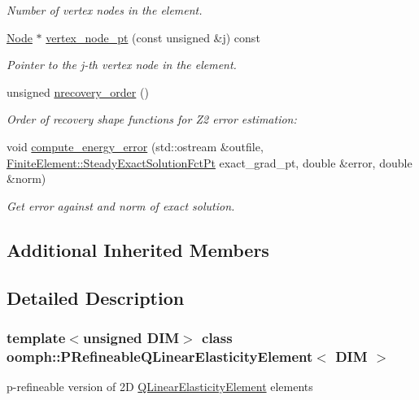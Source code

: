 \begin{DoxyCompactItemize}
\begin{DoxyCompactList}\small\item\em Number of vertex nodes in the element. \end{DoxyCompactList}\item 
\hyperlink{classoomph_1_1Node}{Node} $\ast$ \hyperlink{classoomph_1_1PRefineableQLinearElasticityElement_a0d55b987133d2b9a2f8be959e33ab7eb}{vertex\+\_\+node\+\_\+pt} (const unsigned \&j) const
\begin{DoxyCompactList}\small\item\em Pointer to the j-\/th vertex node in the element. \end{DoxyCompactList}\item 
unsigned \hyperlink{classoomph_1_1PRefineableQLinearElasticityElement_afb227be6ae53f1a72a64b58b57d62ef1}{nrecovery\+\_\+order} ()
\begin{DoxyCompactList}\small\item\em Order of recovery shape functions for Z2 error estimation\+: \end{DoxyCompactList}\item 
void \hyperlink{classoomph_1_1PRefineableQLinearElasticityElement_a2c7c5d71fb2bf00b32420545ac31df68}{compute\+\_\+energy\+\_\+error} (std\+::ostream \&outfile, \hyperlink{classoomph_1_1FiniteElement_a690fd33af26cc3e84f39bba6d5a85202}{Finite\+Element\+::\+Steady\+Exact\+Solution\+Fct\+Pt} exact\+\_\+grad\+\_\+pt, double \&error, double \&norm)
\begin{DoxyCompactList}\small\item\em Get error against and norm of exact solution. \end{DoxyCompactList}\end{DoxyCompactItemize}
\subsection*{Additional Inherited Members}


\subsection{Detailed Description}
\subsubsection*{template$<$unsigned D\+IM$>$\newline
class oomph\+::\+P\+Refineable\+Q\+Linear\+Elasticity\+Element$<$ D\+I\+M $>$}

p-\/refineable version of 2D \hyperlink{classoomph_1_1QLinearElasticityElement}{Q\+Linear\+Elasticity\+Element} elements 

